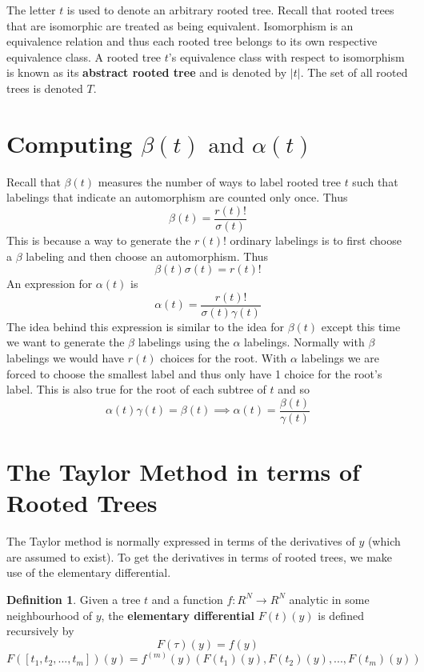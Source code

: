 \documentclass[12pt]{amsart}
\theoremstyle{definition}
\newtheorem*{definition}{Definition}
\begin{document}
   The letter $t$ is used to denote an arbitrary rooted tree. Recall that rooted trees that are isomorphic are
   treated as being equivalent. Isomorphism is an equivalence relation and thus each rooted tree belongs to its
   own respective equivalence class. A rooted tree $t$'s equivalence class with respect to isomorphism is known
   as its \textbf{abstract rooted tree} and is denoted by $|t|$. The set of all rooted trees is denoted $T$.   
  
  
  
  \section{Computing $\beta(t) \mbox{ and } \alpha(t)$}
  Recall that $\beta(t)$ measures the number of ways to label rooted tree $t$ such that
  labelings that indicate an automorphism are counted only once. Thus
  $$\beta(t) = \frac{r(t)!}{\sigma(t)}$$
  This is because a way to generate the $r(t)!$ ordinary labelings is to first choose a $\beta$
  labeling and then choose an automorphism. Thus $$\beta(t)\sigma(t) = r(t)!$$
  An expression for $\alpha(t)$ is
  $$\alpha(t) = \frac{r(t)!}{\sigma(t)\gamma(t)}$$
  The idea behind this expression is similar to the idea for $\beta(t)$ except this time we
  want to generate the $\beta$ labelings using the $\alpha$ labelings. Normally with $\beta$
  labelings we would have $r(t)$ choices for the root. With $\alpha$ labelings we are
  forced to choose the smallest label and thus only have 1 choice for the root's label.
  This is also true for the root of each subtree of $t$ and so
  $$\alpha(t)\gamma(t) = \beta(t) \implies \alpha(t) = \frac{\beta(t)}{\gamma(t)}$$
   
  \section{The Taylor Method in terms of Rooted Trees}
  The Taylor method is normally expressed in terms of the derivatives of $y$ (which are assumed to exist). 
  To get the derivatives in terms of rooted trees, we make use of the elementary differential. 
  
  \begin{definition} 
	Given a tree $t$ and a function $f : R^N \to R^N$ analytic in some
	neighbourhood of $y$, the \textbf{elementary differential} $F(t)(y)$ is defined
	recursively by
	$$F(\tau)(y) = f (y)$$
	$$F([t_1 ,t_2 ,...,t_m ])(y) = f^{(m)}(y)(F(t_1 )(y),F(t_2 )(y),...,F(t_m )(y))$$
  \end{definition}
  
\end{document}
